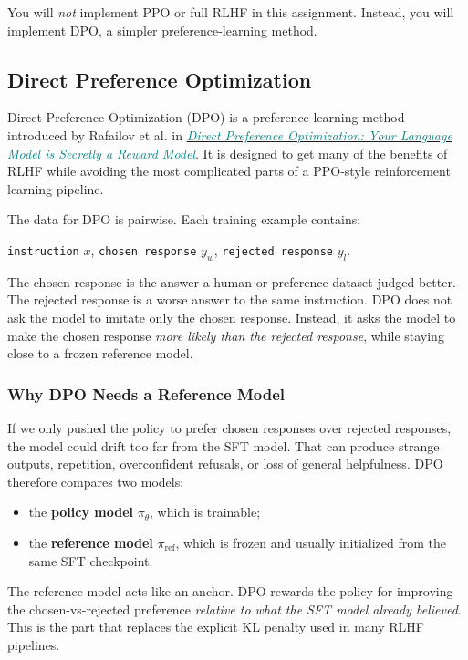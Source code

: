 \documentclass[11pt]{article}
\newcommand{\resource}[2]{\href{#2}{\textcolor{Teal}{#1}}}
\begin{document}
You will \emph{not} implement PPO or full RLHF in this assignment. Instead, you will implement DPO, a simpler preference-learning method.

\subsection{Direct Preference Optimization}
Direct Preference Optimization (DPO) is a preference-learning method introduced by Rafailov et al. in \resource{\emph{Direct Preference Optimization: Your Language Model is Secretly a Reward Model}}{https://arxiv.org/abs/2305.18290}. It is designed to get many of the benefits of RLHF while avoiding the most complicated parts of a PPO-style reinforcement learning pipeline.

The data for DPO is pairwise. Each training example contains:
\begin{center}
\texttt{instruction} $x$, \texttt{chosen response} $y_w$, \texttt{rejected response} $y_l$.
\end{center}
The chosen response is the answer a human or preference dataset judged better. The rejected response is a worse answer to the same instruction. DPO does not ask the model to imitate only the chosen response. Instead, it asks the model to make the chosen response \emph{more likely than the rejected response}, while staying close to a frozen reference model.

\subsubsection{Why DPO Needs a Reference Model}
If we only pushed the policy to prefer chosen responses over rejected responses, the model could drift too far from the SFT model. That can produce strange outputs, repetition, overconfident refusals, or loss of general helpfulness. DPO therefore compares two models:
\begin{itemize}[leftmargin=*]
  \item the \textbf{policy model} $\pi_\theta$, which is trainable;
  \item the \textbf{reference model} $\pi_{\mathrm{ref}}$, which is frozen and usually initialized from the same SFT checkpoint.
\end{itemize}
The reference model acts like an anchor. DPO rewards the policy for improving the chosen-vs-rejected preference \emph{relative to what the SFT model already believed}. This is the part that replaces the explicit KL penalty used in many RLHF pipelines.
\end{document}
